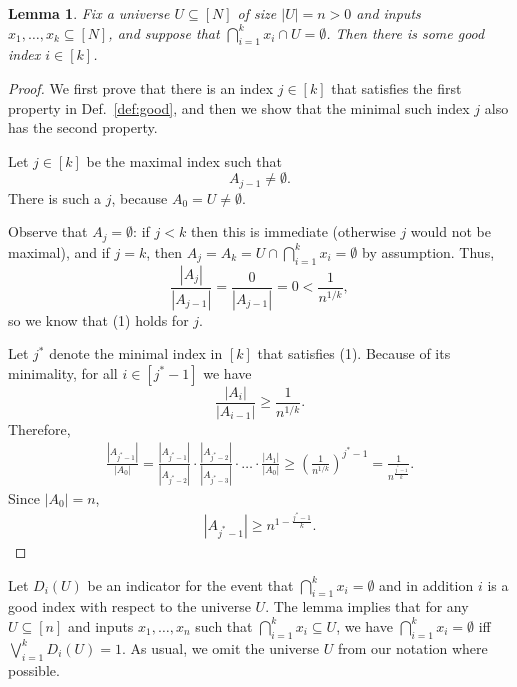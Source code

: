 \documentclass{article}
\theoremstyle{plain}
\newtheorem{lemma}[theorem]{Lemma}
\begin{document}
\begin{lemma}
  Fix a universe $U \subseteq [N]$ of size $|U| = n > 0$ and inputs $x_1,\ldots,x_k \subseteq [N]$,
  and suppose that $\bigcap_{i = 1}^k x_i \cap U = \emptyset$.
  Then there is some good index $i \in [k]$.
  \label{lemma:narrow}
\end{lemma}
\begin{proof}
  We first prove that there is an index $j \in [k]$ that satisfies the first property in Def.~\ref{def:good}, and then we show
  that the minimal such index $j$ also has the second property.

  Let $j \in [k]$ be the maximal index such that 
  \begin{equation*}
    A_{j-1} \neq \emptyset.
  \end{equation*}
  There is such a $j$, because $A_0 = U \neq \emptyset$.

  Observe that $A_{j} = \emptyset$:
  if $j < k$ then this is immediate (otherwise $j$ would not be maximal),
  and
  if $j = k$, then $A_j = A_k = U \cap \bigcap_{i=1}^k x_i = \emptyset$ by assumption.
  Thus,
  \begin{equation*}
    \frac{|A_j|}{|A_{j-1}|} = \frac{0}{|A_{j-1}|} = 0 < \frac{1}{n^{1/k}},
  \end{equation*}
  so we know that (1) holds for $j$.


  Let $j^{\ast}$ denote the minimal index in $[k]$ that satisfies (1).
  Because of its minimality, for all $i \in [j^\ast-1]$ we have
  \begin{equation*}
    \frac{|A_i|}{|A_{i-1}|} \geq \frac{1}{n^{1/k}}.
  \end{equation*}
  Therefore,
  \begin{align*}
    \frac{|A_{j^\ast - 1}|}{|A_0|} = 
    \frac{|A_{j^\ast - 1}|}{|A_{j^\ast-2}|} \cdot \frac{|A_{j^\ast-2}|}{|A_{j^\ast-3}|} \cdot \ldots \cdot \frac{|A_1|}{|A_0|}
    \geq
    \left(  \frac{1}{n^{1/k}} \right)^{j^\ast - 1}
    =
    \frac{1}{n^{\frac{j^\ast - 1}{k}}}.
  \end{align*}
  Since $|A_0| = n$, 
  \begin{align*}
    |A_{j^\ast - 1}| \geq n^{1 - \frac{j^\ast-1}{k}}.
  \end{align*}
\end{proof}

Let $D_i(U)$ be an indicator for the event that $\bigcap_{i = 1}^k x_i = \emptyset$ and in addition $i$ is a good index
with respect to the universe $U$.
The lemma implies that for any $U \subseteq [n]$ and inputs $x_1,\ldots,x_n$ such that $\bigcap_{i = 1}^k x_i \subseteq U$,
we have
$\bigcap_{i = 1}^k x_i = \emptyset$
iff $\bigvee_{i = 1}^k D_i(U) = 1$.
As usual, we omit the universe $U$ from our notation where possible.
\end{document}
